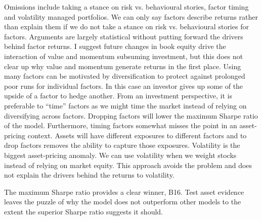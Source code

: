 Omissions include taking a stance on risk vs. behavioural stories, factor timing and
volatility managed portfolios. We can only say factors describe returns rather than
explain them if we do not take a stance on risk vs. behavioural stories for factors.
Arguments are largely statistical without putting forward the drivers behind factor
returns. I suggest future changes in book equity drive the interaction of value and
momentum subsuming investment, but this does not clear up why value and momentum generate
returns in the first place. Using many factors can be motivated by diversification to
protect against prolonged poor runs for individual factors. In this case an investor gives
up some of the upside of a factor to hedge another. From an investment perspective, it is
preferable to “time” factors as we might time the market instead of relying on
diversifying across factors. Dropping factors will lower the maximum Sharpe ratio of the
model. Furthermore, timing factors somewhat misses the point in an asset-pricing context.
Assets will have different exposures to different factors and to drop factors removes the
ability to capture those exposures. Volatility is the biggest asset-pricing anomaly. We
can use volatility when we weight stocks instead of relying on market equity. This
approach avoids the problem and does not explain the drivers behind the returns to
volatility.

The maximum Sharpe ratio provides a clear winner, B16. Test asset evidence leaves the
puzzle of why the model does not outperform other models to the extent the superior Sharpe
ratio suggests it should.
